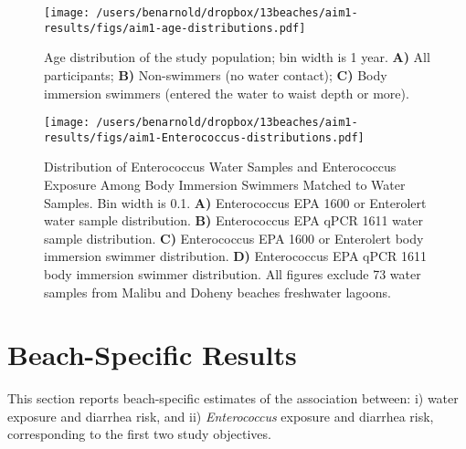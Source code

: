 \documentclass[12pt]{article}\usepackage[]{graphicx}\usepackage[]{color}
\begin{document}
\begin{figure}
\begin{center}
\texttt{[image: /users/benarnold/dropbox/13beaches/aim1-results/figs/aim1-age-distributions.pdf]}
\caption{Age distribution of the study population; bin width is 1 year. \textbf{A)} All participants; \textbf{B)} Non-swimmers (no water contact); \textbf{C)} Body immersion swimmers (entered the water to waist depth or more). \label{fig:agedist}}
\end{center}
\end{figure}


\begin{figure}
\begin{center}
\texttt{[image: /users/benarnold/dropbox/13beaches/aim1-results/figs/aim1-Enterococcus-distributions.pdf]}
\caption{Distribution of Enterococcus Water Samples and Enterococcus Exposure Among Body Immersion Swimmers Matched to Water Samples. Bin width is 0.1.  \textbf{A)} Enterococcus EPA 1600 or Enterolert water sample distribution. \textbf{B)} Enterococcus EPA qPCR 1611 water sample distribution. \textbf{C)} Enterococcus EPA 1600 or Enterolert body immersion swimmer distribution. \textbf{D)} Enterococcus EPA qPCR 1611 body immersion swimmer distribution.  All figures exclude 73 water samples from Malibu and Doheny beaches freshwater lagoons.
\label{fig:enterodist}}
\end{center}
\end{figure}



\clearpage
\section{Beach-Specific Results}



This section reports beach-specific estimates of the association between: i) water exposure and diarrhea risk, and ii) \emph{Enterococcus} exposure and diarrhea risk, corresponding to the first two study objectives.
\end{document}
